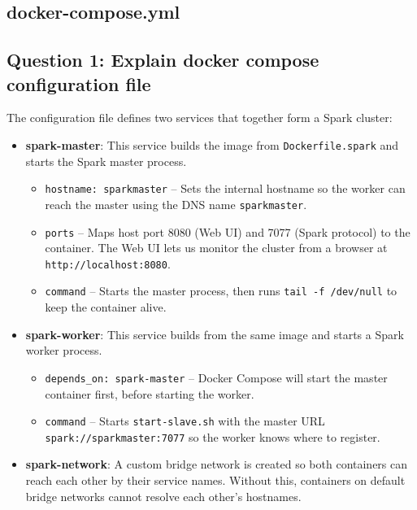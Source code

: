 \documentclass[11pt,a4paper]{article}
\begin{document}


\subsection{docker-compose.yml}



\subsection{Question 1: Explain docker compose configuration file}

The configuration file defines two services that together form a Spark cluster:

\begin{itemize}[leftmargin=1.5cm]
  \item \textbf{spark-master}: This service builds the image from
        \texttt{Dockerfile.spark} and starts the Spark master process.
        \begin{itemize}
          \item \texttt{hostname: sparkmaster} -- Sets the internal hostname
                so the worker can reach the master using the DNS name
                \texttt{sparkmaster}.
          \item \texttt{ports} -- Maps host port 8080 (Web UI) and 7077
                (Spark protocol) to the container. The Web UI lets us
                monitor the cluster from a browser at
                \texttt{http://localhost:8080}.
          \item \texttt{command} -- Starts the master process, then runs
                \texttt{tail -f /dev/null} to keep the container alive.
        \end{itemize}

  \item \textbf{spark-worker}: This service builds from the same image
        and starts a Spark worker process.
        \begin{itemize}
          \item \texttt{depends\_on: spark-master} -- Docker Compose will
                start the master container first, before starting the worker.
          \item \texttt{command} -- Starts \texttt{start-slave.sh} with the
                master URL \texttt{spark://sparkmaster:7077} so the worker
                knows where to register.
        \end{itemize}

  \item \textbf{spark-network}: A custom bridge network is created so
        both containers can reach each other by their service names. Without
        this, containers on default bridge networks cannot resolve each
        other's hostnames.
\end{itemize}
\end{document}
